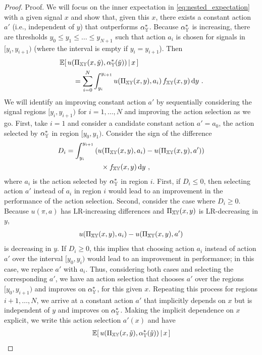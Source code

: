 \begin{proof}{Proof.}
We will focus on the inner expectation in
\eqref{eq:nested_expectation} with a given signal $x$ and show that,
given this $x$, there exists a constant action $a'$ (i.e., independent
of $y$) that outperforms $\alpha_{\mathbb{Y}}^*$. Because $\alpha_{\mathbb{Y}}^*$ is
increasing, there are thresholds $y_0 \leq y_1 \leq \ldots \leq
y_{N+1}$ such that action $a_i$ is chosen for signals in
$[y_i,y_{i+1})$ (where the interval is empty if $y_i = y_{i+1}$). Then
\begin{align}
&\cev{u(\Pi_\iXY(x,\tilde{y}),\alpha_\iY^*(\tilde{y}))}{x} \notag\\
&\qquad = \sum_{i=0}^N \int_{y_{i}}^{y_{i+1}} u(\Pi_\iXY(x,y),a_i)\,
  f_\iXY(x,y) \dif y \ . \label{eq:regions}
\end{align}
We will identify an improving constant action $a'$ by sequentially
considering the signal regions $[y_i,y_{i+1})$ for $i = 1, \ldots, N$
and improving the action selection as we go. First, take $i=1$ and
consider a candidate constant action $a' = a_0$, the action selected by
$\alpha_{\mathbb{Y}}^*$ in region $[y_0,y_1)$. Consider the sign of the
difference
\begin{align}
D_i = \int_{y_i}^{y_{i+1}}
  &\left(u(\Pi_{\mathbb{XY}}(x,y),a_i) - u(\Pi_{\mathbb{XY}}(x,y),a')\right) \notag\\
  &\quad \times f_{\mathbb{XY}}(x,y) \mathop{}\!\mathrm{d} y \ , \label{eq:Di}
\end{align}
where $a_i$ is the action selected by $\alpha_{\mathbb{Y}}^*$ in region $i$.
First, if $D_i \leq 0$, then selecting action $a'$ instead of $a_i$ in
region $i$ would lead to an improvement in the performance of the
action selection. Second, consider the case where $D_i \geq 0$.
Because $u(\pi,a)$ has LR-increasing differences and $\Pi_{\mathbb{XY}}(x, y)$
is LR-decreasing in $y$,
$$u(\Pi_{\mathbb{XY}}(x,y),a_i) - u(\Pi_{\mathbb{XY}}(x,y),a')$$
is decreasing in $y$. If $D_i \geq 0$, this implies that choosing
action $a_i$ instead of action $a'$ over the interval $[y_0,y_i)$
would lead to an improvement in performance; in this case, we replace
$a'$ with $a_i$. Thus, considering both cases and selecting the
corresponding $a'$, we have an action selection that chooses $a'$ over
the regions $[y_0, y_{i+1})$ and improves on $\alpha_{\mathbb{Y}}^*$, for this
given $x$. Repeating this process for regions $i+1, \ldots, N$, we
arrive at a constant action $a'$ that implicitly depends on $x$ but is
independent of $y$ and improves on $\alpha_{\mathbb{Y}}^*$. Making the implicit
dependence on $x$ explicit, we write this action selection $a'(x)$ and
have
\begin{align}
\cev{u(\Pi_\iXY(x,\tilde{y}),\alpha_\iY^*(\tilde{y}))}{x}

\end{align}
\end{proof}

